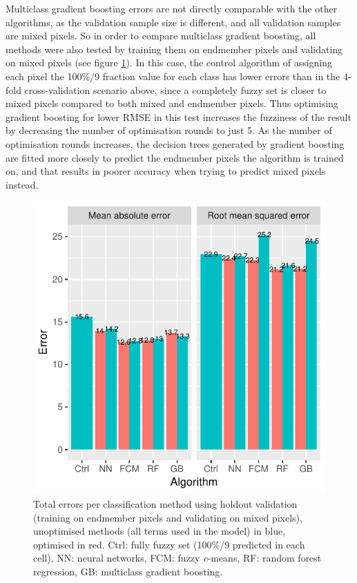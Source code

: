 \documentclass[a4paper,10pt]{book}
\begin{document}
Multiclass gradient boosting errors are not directly comparable with the other algorithms, as the validation sample size is different, and all validation samples are mixed pixels. So in order to compare multiclass gradient boosting, all methods were also tested by training them on endmember pixels and validating on mixed pixels (see figure \ref{fig-total-errors-gb}). In this case, the control algorithm of assigning each pixel the 100\%/9 fraction value for each class has lower errors than in the 4-fold cross-validation scenario above, since a completely fuzzy set is closer to mixed pixels compared to both mixed and endmember pixels. Thus optimising gradient boosting for lower RMSE in this test increases the fuzziness of the result by decreasing the number of optimisation rounds to just 5. As the number of optimisation rounds increases, the decision trees generated by gradient boosting are fitted more closely to predict the endmember pixels the algorithm is trained on, and that results in poorer accuracy when trying to predict mixed pixels instead.

\begin{figure}
  \centering
  \includegraphics{../plot/total-errors-gb}
  \caption{Total errors per classification method using holdout validation (training on endmember pixels and validating on mixed pixels), unoptimised methods (all terms used in the model) in blue, optimised in red. Ctrl: fully fuzzy set (100\%/9 predicted in each cell), NN: neural networks, FCM: fuzzy \textit{c}-means, RF: random forest regression, GB: multiclass gradient boosting.}
  \label{fig-total-errors-gb}
\end{figure}
\end{document}
